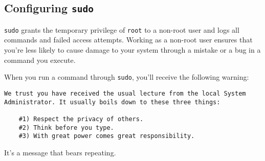 \documentclass[12pt,letterpaper]{article}
\begin{document}
\subsection{Configuring \lstinline{sudo}}
\lstinline{sudo} grants the temporary privilege of \lstinline{root} to a non-root user and logs all commands and failed access attempts.  Working as a non-root user ensures that you're less likely to cause damage to your system through a mistake or a bug in a command you execute.

When you run a command through \lstinline{sudo}, you'll receive the following warning:
\begin{lstlisting}[basicstyle=\ttfamily\footnotesize]
We trust you have received the usual lecture from the local System
Administrator. It usually boils down to these three things:

    #1) Respect the privacy of others.
    #2) Think before you type.
    #3) With great power comes great responsibility.
\end{lstlisting}
It's a message that bears repeating.
\end{document}
